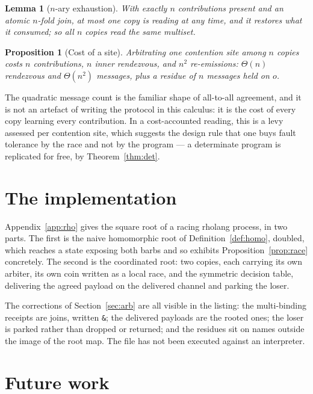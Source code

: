 \documentclass[11pt]{article}
\newtheorem{proposition}[theorem]{Proposition}
\newtheorem{lemma}[theorem]{Lemma}
\theoremstyle{definition}
\begin{document}
\begin{lemma}[$n$-ary exhaustion]
With exactly $n$ contributions present and an atomic $n$-fold join, at most one copy is reading at any time, and it restores what it consumed; so all $n$ copies read the same multiset.
\end{lemma}

\begin{proposition}[Cost of a site]
Arbitrating one contention site among $n$ copies costs $n$ contributions, $n$ inner rendezvous, and $n^{2}$ re-emissions: $\Theta(n)$ rendezvous and $\Theta(n^{2})$ messages, plus a residue of $n$ messages held on $o$.
\end{proposition}

The quadratic message count is the familiar shape of all-to-all agreement, and it is not an artefact of writing the protocol in this calculus: it is the cost of every copy learning every contribution. In a cost-accounted reading, this is a levy assessed per contention site, which suggests the design rule that one buys fault tolerance by the race and not by the program --- a determinate program is replicated for free, by Theorem~\ref{thm:det}.

\section{The implementation}\label{sec:impl}

Appendix~\ref{app:rho} gives the square root of a racing rholang process, in two parts. The first is the naive homomorphic root of Definition~\ref{def:homo}, doubled, which reaches a state exposing both barbs and so exhibits Proposition~\ref{prop:race} concretely. The second is the coordinated root: two copies, each carrying its own arbiter, its own coin written as a local race, and the symmetric decision table, delivering the agreed payload on the delivered channel and parking the loser.

The corrections of Section~\ref{sec:arb} are all visible in the listing: the multi-binding receipts are joins, written \texttt{\&}; the delivered payloads are the rooted ones; the loser is parked rather than dropped or returned; and the residues sit on names outside the image of the root map. The file has not been executed against an interpreter.

\section{Future work}\label{sec:future}
\end{document}
